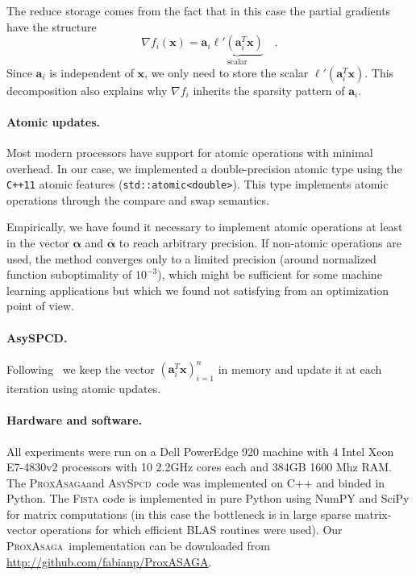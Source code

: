 \documentclass{article}
\newcommand{\PASAGA}{\textsc{ProxAsaga}}
\newcommand{\AsySPCD}{\textsc{AsySpcd}}
\def\xx{{\boldsymbol x}}
\def\balpha{{\boldsymbol \alpha}}
\begin{document}
The reduce storage comes from the fact that in this case the partial gradients have the structure
\begin{equation}
\nabla f_i(\xx) = \boldsymbol a_i \underbrace{\ell'(\boldsymbol a_i^T \xx)}_{\text{ scalar }} \quad.
\end{equation}
Since $\boldsymbol a_i$ is independent of $\xx$, we only need to store the scalar $\ell'(\boldsymbol a_i^T \xx)$. This decomposition also explains why $\nabla f_i$ inherits the sparsity pattern of $\boldsymbol a_i$.

\paragraph{Atomic updates.} Most modern processors have support for atomic operations with minimal overhead. In our case, we implemented a double-precision atomic type using the {\verb!C++11!} atomic features (\verb!std::atomic<double>!). This type implements atomic operations through the compare and swap semantics.

Empirically, we have found it necessary to implement atomic operations at least in the vector $\balpha$ and $\overline\balpha$ to reach arbitrary precision. If non-atomic operations are used, the method converges only to a limited precision (around normalized function suboptimality of $10^{-3}$), which might be sufficient for some machine learning applications but which we found not satisfying from an optimization point of view.

\paragraph{AsySPCD.} Following~\citep{peng2016arock} we keep the vector $(\boldsymbol a_i^T \xx)_{i=1}^n$ in memory and update it at each iteration using atomic updates.

\paragraph{Hardware and software.}
All experiments were run on a Dell PowerEdge 920 machine with 4 Intel Xeon E7-4830v2
processors with 10 2.2GHz cores each and 384GB 1600 Mhz RAM.
The \PASAGA and \AsySPCD\ code was implemented on C++ and binded in Python. The \textsc{Fista} code is implemented in pure Python using NumPY and SciPy for matrix computations (in this case the bottleneck is in large sparse matrix-vector operations for which efficient BLAS routines were used). Our \PASAGA\ implementation can be downloaded from \url{http://github.com/fabianp/ProxASAGA}.
\end{document}
